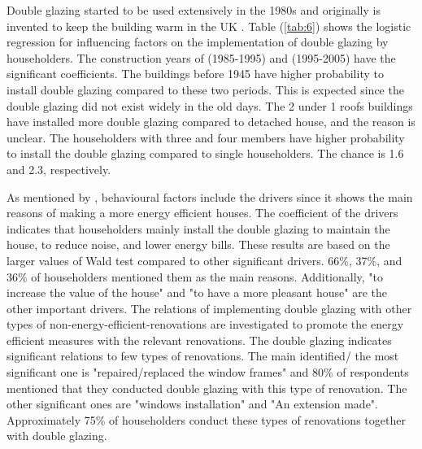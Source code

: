 \documentclass[preprint,12pt,3p]{elsarticle}
\begin{document}
Double glazing started to be used extensively in the 1980s and originally is invented to keep the building warm in the UK \citep{george1884}. Table (\ref{tab:6}) shows the logistic regression for influencing factors on the implementation of double glazing by householders. The construction years of (1985-1995) and (1995-2005) have the significant coefficients. The buildings before 1945 have higher probability to install double glazing compared to these two periods. This is expected since the double glazing did not exist widely in the old days. The 2 under 1 roofs buildings have installed more double glazing compared to detached house, and the reason is unclear. The householders with three and four members have higher probability to install the double glazing compared to single householders. The chance is 1.6 and 2.3, respectively. 

As mentioned by \citep{ebrahimi2019}, behavioural factors include the drivers since it shows the main reasons of making a more energy efficient houses. The coefficient of the drivers indicates that householders mainly install the double glazing to maintain the house, to reduce noise, and lower energy bills. These results are based on the larger values of Wald test compared to other significant drivers. 66\%, 37\%, and 36\% of householders mentioned them as the main reasons. Additionally, "to increase the value of the house" and "to have a more pleasant house" are the other important drivers. The relations of implementing double glazing with other types of non-energy-efficient-renovations are investigated to promote the energy efficient measures with the relevant renovations. The double glazing indicates significant relations to few types of renovations. The main identified/ the most significant one is  "repaired/replaced the window frames" and 80\% of respondents mentioned that they conducted double glazing with this type of renovation. The other significant ones are "windows installation" and "An extension made". Approximately 75\% of householders conduct these types of renovations together with double glazing.    
\end{document}
